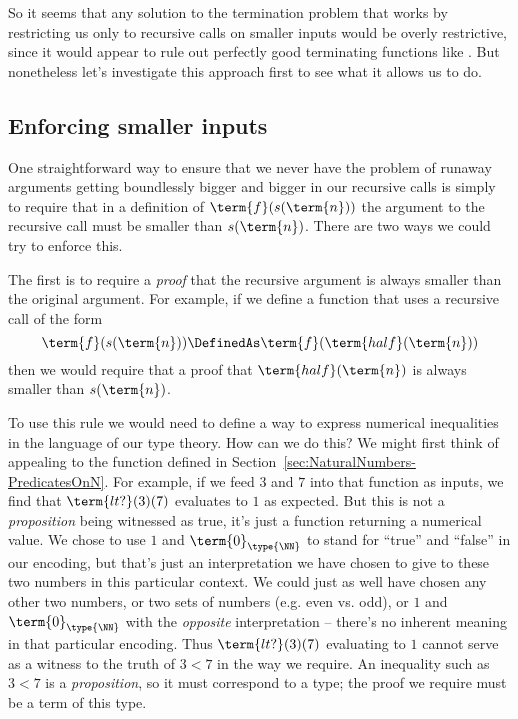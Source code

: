 So it seems that any solution to the termination problem that works by restricting us only to recursive calls on smaller inputs would be overly restrictive, since it would appear to rule out perfectly good terminating functions like .  But nonetheless let's investigate this approach first to see what it allows us to do.



\newpage
\subsection{Enforcing smaller inputs}

One straightforward way to ensure that we never have the problem of runaway arguments getting boundlessly bigger and bigger in our recursive calls is simply to require that in a definition of $\term{f}(s(\term{n}))$
the argument to the recursive call must be smaller than $s(\term{n})$.
There are two ways we could try to enforce this.  

The first is to require a \emph{proof} that the recursive argument is always smaller than the original argument.  For example, if we define a function that uses a recursive call of the form
\[
\term{f}(s(\term{n})) \DefinedAs
\term{f}(\term{half}(\term{n}))
\]
then we would require that a proof that  
$\term{half}(\term{n})$ is always smaller than $s(\term{n})$.  

To use this rule we would need to define a way to express numerical inequalities in the language of our type theory.  How can we do this?
We might first think of appealing to the function  defined in Section~\ref{sec:NaturalNumbers-PredicatesOnN}.  For example, if we feed $3$ and $7$ into that function as inputs, we find that
$\term{lt?}(3)(7)$ evaluates to $1$ as expected.  But this is not a \emph{proposition} being witnessed as true, it's just a function returning a numerical value.  We chose to use $1$ and $\term{0}_{\type{\NN}}$ to stand for ``true'' and ``false'' in our encoding, but that's just an interpretation we have chosen to give to these two numbers in this particular context.  We could just as well have chosen any other two numbers, or two sets of numbers (e.g. even vs. odd), or $1$ and $\term{0}_{\type{\NN}}$ with the \emph{opposite} interpretation -- there's no inherent meaning in that particular encoding.  Thus $\term{lt?}(3)(7)$ evaluating to $1$ cannot serve as a witness to the truth of $3 < 7$ in the way we require.  
An inequality such as $3 < 7$ is a \emph{proposition}, so it must correspond to a type; the proof we require must be a term of this type.

